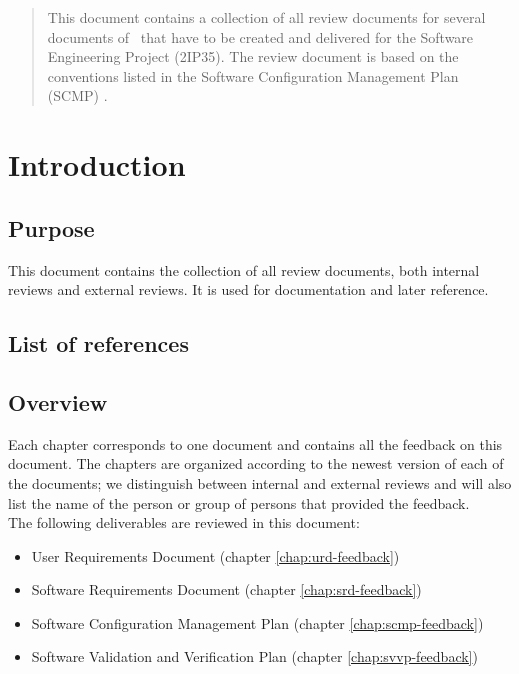 \documentclass[%
		pathtobase=..,%
		titlefull={Review Document},%
		titleabbr=Review,%
		version=0.7]{fingerpaint}
\begin{document}
\maketitle{}

\begin{abstract}
This document contains a collection of all review documents for several documents of \projectname\ that have to be created and delivered for the Software Engineering Project (2IP35). The review document is based on the conventions listed in the Software Configuration Management Plan (SCMP) \cite{scmp}.
\end{abstract}

\tableofcontents



\chapter{Introduction}
\section{Purpose}
This document contains the collection of all review documents, both internal reviews and external reviews. It is used for documentation and later reference.

\section{List of references}


\section{Overview}
Each chapter corresponds to one document and contains all the feedback on this document. The chapters are organized according to the newest version of each of the documents; we distinguish between internal and external reviews and will also list the name of the person or group of persons that provided the feedback. \\
The following deliverables are reviewed in this document:
\begin{itemize}
\item User Requirements Document \cite{urd} (chapter \ref{chap:urd-feedback})
\item Software Requirements Document \cite{srd} (chapter \ref{chap:srd-feedback})
\item Software Configuration Management Plan \cite{scmp} (chapter \ref{chap:scmp-feedback})
\item Software Validation and Verification Plan \cite{svvp} (chapter \ref{chap:svvp-feedback})
\end{itemize}






\end{document}
